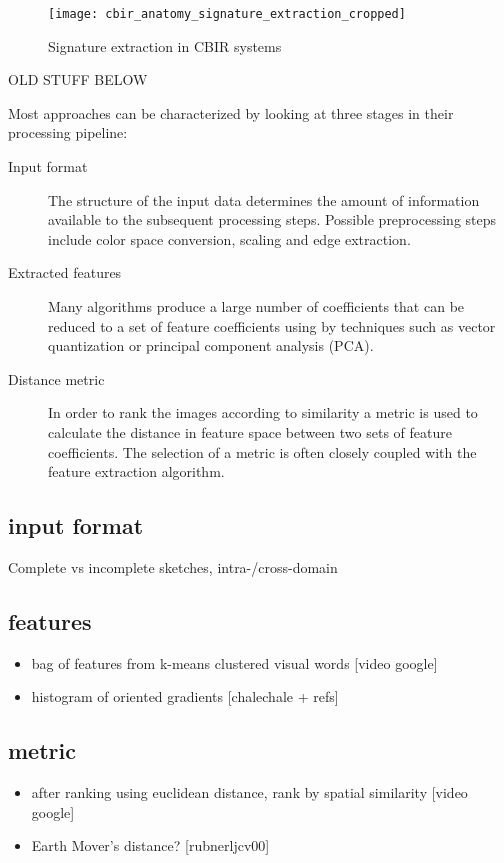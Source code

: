 \begin{figure}[h]
    \centering
        \texttt{[image: cbir\_anatomy\_signature\_extraction\_cropped]}
    \caption{Signature extraction in CBIR systems}
    \label{fig:cbir_signature_extraction}
\end{figure}

OLD STUFF BELOW

Most approaches can be characterized by looking at three stages in their processing pipeline:

\begin{description}
    \item[Input format] The structure of the input data determines the amount of information available to the subsequent processing steps. Possible preprocessing steps include color space conversion, scaling and edge extraction.
    \item[Extracted features] Many algorithms produce a large number of coefficients that can be reduced to a set of feature coefficients using by techniques such as vector quantization or principal component analysis (PCA).
    \item[Distance metric] In order to rank the images according to similarity a metric is used to calculate the distance in feature space between two sets of feature coefficients. The selection of a metric is often closely coupled with the feature extraction algorithm.
\end{description}

\subsection{input format}
Complete vs incomplete sketches, intra-/cross-domain

\subsection{features}

\begin{itemize}
    \item bag of features from k-means clustered visual words [video google]
    \item histogram of oriented gradients [chalechale + refs]
\end{itemize}

\subsection{metric}

\begin{itemize}
    \item after ranking using euclidean distance, rank by spatial similarity [video google]
    \item Earth Mover's distance? [rubnerljcv00]
\end{itemize}
